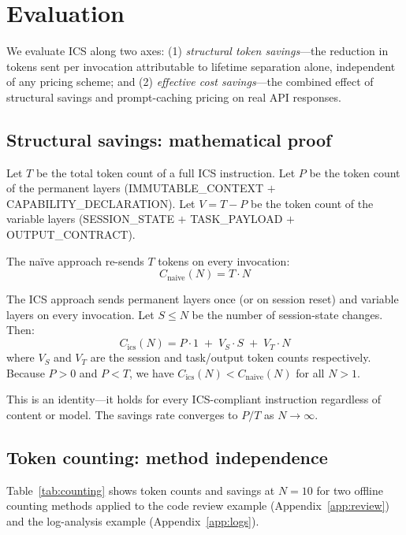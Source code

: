 \documentclass[11pt]{article}
\begin{document}
\section{Evaluation}
\label{sec:eval}

We evaluate ICS along two axes: (1) \emph{structural token savings}---the
reduction in tokens sent per invocation attributable to lifetime separation
alone, independent of any pricing scheme; and (2) \emph{effective cost
savings}---the combined effect of structural savings and prompt-caching
pricing on real API responses.

\subsection{Structural savings: mathematical proof}
\label{sec:proof}

Let $T$ be the total token count of a full ICS instruction.
Let $P$ be the token count of the permanent layers
(IMMUTABLE\_CONTEXT $+$ CAPABILITY\_DECLARATION).
Let $V = T - P$ be the token count of the variable layers
(SESSION\_STATE $+$ TASK\_PAYLOAD $+$ OUTPUT\_CONTRACT).

The na\"{i}ve approach re-sends $T$ tokens on every invocation:
\[
  C_{\text{naive}}(N) = T \cdot N
\]

The ICS approach sends permanent layers once (or on session reset) and
variable layers on every invocation. Let $S \leq N$ be the number of
session-state changes. Then:
\[
  C_{\text{ics}}(N) = P \cdot 1 \;+\; V_S \cdot S \;+\; V_T \cdot N
\]
where $V_S$ and $V_T$ are the session and task/output token counts
respectively. Because $P > 0$ and $P < T$, we have
$C_{\text{ics}}(N) < C_{\text{naive}}(N)$ for all $N > 1$.

This is an identity---it holds for every ICS-compliant instruction regardless
of content or model. The savings rate converges to $P/T$ as $N \to \infty$.

\subsection{Token counting: method independence}
\label{sec:counting}

Table~\ref{tab:counting} shows token counts and savings at $N{=}10$
for two offline counting methods applied to the code review example
(Appendix~\ref{app:review}) and the log-analysis example (Appendix~\ref{app:logs}).
\end{document}
